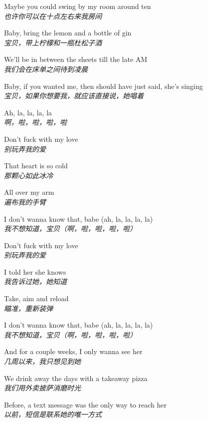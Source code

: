 \begin{spacing}{1.5}
\begin{flushleft}
Maybe you could swing by my room around ten\\
\textit{也许你可以在十点左右来我房间}\lyricspace

Baby, bring the lemon and a bottle of gin\\
\textit{宝贝，带上柠檬和一瓶杜松子酒}\lyricspace

We'll be in between the sheets till the late AM\\
\textit{我们会在床单之间待到凌晨}\lyricspace

Baby, if you wanted me, then should have just said, she's singing\\
\textit{宝贝，如果你想要我，就应该直接说，她唱着}\lyricspace

Ah, la, la, la, la\\
\textit{啊，啦，啦，啦，啦}\lyricspace

Don't fuck with my love\\
\textit{别玩弄我的爱}\lyricspace

That heart is so cold\\
\textit{那颗心如此冰冷}\lyricspace

All over my arm\\
\textit{遍布我的手臂}\lyricspace

I don't wanna know that, babe (ah, la, la, la, la)\\
\textit{我不想知道，宝贝（啊，啦，啦，啦，啦）}\lyricspace

Don't fuck with my love\\
\textit{别玩弄我的爱}\lyricspace

I told her she knows\\
\textit{我告诉过她，她知道}\lyricspace

Take, aim and reload\\
\textit{瞄准，重新装弹}\lyricspace

I don't wanna know that, babe (ah, la, la, la, la)\\
\textit{我不想知道，宝贝（啊，啦，啦，啦，啦）}\lyricspace

And for a couple weeks, I only wanna see her\\
\textit{几周以来，我只想见到她}\lyricspace

We drink away the days with a takeaway pizza\\
\textit{我们用外卖披萨消磨时光}\lyricspace

Before, a text message was the only way to reach her\\
\textit{以前，短信是联系她的唯一方式}\lyricspace


\end{flushleft}
\end{spacing}
